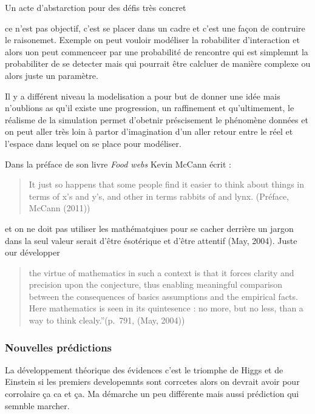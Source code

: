 Un acte d'abstarction pour des défis très concret

ce n'est pas objectif, c'est se placer dans un cadre et c'est une façon
de contruire le raisonemet. Exemple on peut vouloir modéliser la
robabiliter d'interaction et alors uon peut commenceer par une
probabilité de rencontre qui est simplemnt la probabiliter de se
detecter mais qui pourrait être calcluer de manière complexe ou alors
juste un paramètre.

Il y a différent niveau la modelisation a pour but de donner une idée
mais n'oublions as qu'il existe une progression, un raffinement et
qu'ultimement, le réalisme de la simulation permet d'obetnir
préscisement le phénomène données et on peut aller très loin à partor
d'imagination d'un aller retour entre le réel et l'espace dans lequel on
se place pour modéliser.

Dans la préface de son livre \emph{Food webs} Kevin McCann écrit :

\begin{quote}
\guillemotleft It just so happens that some people find it easier to
think about things in terms of x's and y's, and other in terms rabbits
of and lynx. \guillemotright (Préface, McCann (2011))
\end{quote}

et on ne doit pas utiliser les mathématqiues pour se cacher derrière un
jargon dans la seul valeur serait d'être ésotérique et d'être attentif
(May, 2004). Juste our développer

\begin{quote}
the virtue of mathematics in such a context is that it forces clarity
and precision upon the conjecture, thus enabling meaningful comparison
between the consequences of basics assumptions and the empirical facts.
Here mathematics is seen in its quintesence : no more, but no less, than
a way to think clealy.''(p.~791, (May, 2004))
\end{quote}

\subsubsection*{Nouvelles prédictions}\label{nouvelles-pruxe9dictions}

La développement théorique des évidences c'est le triomphe de Higgs et
de Einstein si les premiers developemnts sont corrcetes alors on devrait
avoir pour corrolaire ça ca et ça. Ma démarche un peu différente mais
aussi prédiction qui semnble marcher.

